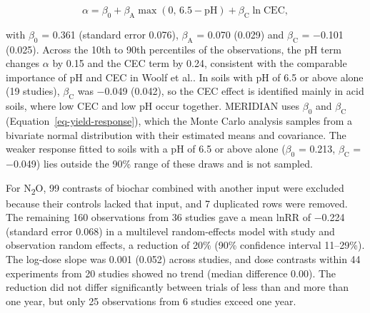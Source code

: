 \documentclass[
  letterpaper,
  twoside,
  twocolumn,
  9pt]{article}
\begin{document}
\[\alpha = \beta_0 + \beta_{\mathrm{A}} \max(0,\, 6.5 - \mathrm{pH}) + \beta_{\mathrm{C}} \ln \mathrm{CEC},\]

with \(\beta_0\) = 0.361 (standard error 0.076), \(\beta_{\mathrm{A}}\)
= 0.070 (0.029) and \(\beta_{\mathrm{C}}\) = −0.101 (0.025). Across the
10th to 90th percentiles of the observations, the pH term changes
\(\alpha\) by 0.15 and the CEC term by 0.24, consistent with the
comparable importance of pH and CEC in Woolf et
al.\citep{woolf2016optimal}. In soils with pH of 6.5 or above alone (19
studies), \(\beta_{\mathrm{C}}\) was −0.049 (0.042), so the CEC effect
is identified mainly in acid soils, where low CEC and low pH occur
together. MERIDIAN uses \(\beta_0\) and \(\beta_{\mathrm{C}}\)
(Equation~\ref{eq-yield-response}), which the Monte Carlo analysis
samples from a bivariate normal distribution with their estimated means
and covariance. The weaker response fitted to soils with a pH of 6.5 or
above alone (\(\beta_0\) = 0.213, \(\beta_{\mathrm{C}}\) = −0.049) lies
outside the 90\% range of these draws and is not sampled.

For N\textsubscript{2}O, 99 contrasts of biochar combined with another
input were excluded because their controls lacked that input, and 7
duplicated rows were removed. The remaining 160 observations from 36
studies gave a mean lnRR of −0.224 (standard error 0.068) in a
multilevel random-effects model with study and observation random
effects, a reduction of 20\% (90\% confidence interval 11--29\%). The
log-dose slope was 0.001 (0.052) across studies, and dose contrasts
within 44 experiments from 20 studies showed no trend (median difference
0.00). The reduction did not differ significantly between trials of less
than and more than one year, but only 25 observations from 6 studies
exceed one year.
\end{document}
